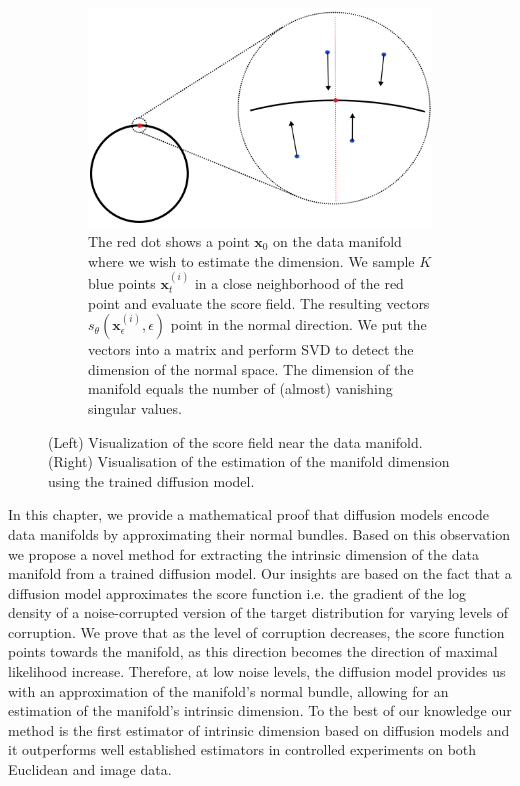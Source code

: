 \begin{figure}[h]
\begin{subfigure}[t]{0.45\linewidth}
        \includegraphics[width=\linewidth]{Outline/figures/id-diff/drawing.png}
        \caption{The red dot shows a point $\textbf{x}_0$ on the data manifold where we wish to estimate the dimension. We sample $K$ blue points $\textbf{x}_t^{(i)}$ in a close neighborhood of the red point and evaluate the score field. The resulting vectors $s_\theta(\textbf{x}_\epsilon^{(i)}, \epsilon)$ point in the normal direction. We put the vectors into a matrix and perform SVD to detect the dimension of the normal space. The dimension of the manifold equals the number of (almost) vanishing singular values.}
        \label{fig:zoom}
    \end{subfigure}
    \caption{(Left) Visualization of the score field near the data manifold. (Right) Visualisation of the estimation of the manifold dimension using the trained diffusion model.}
    \label{fig:score_estimation}
\end{figure}



In this chapter, we provide a mathematical proof
that diffusion models encode data manifolds by
approximating their normal bundles. Based on
this observation we propose a novel method for
extracting the intrinsic dimension of the data manifold from a trained diffusion model. Our insights
are based on the fact that a diffusion model approximates the score function i.e. the gradient
of the log density of a noise-corrupted version of
the target distribution for varying levels of corruption. We prove that as the level of corruption
decreases, the score function points towards the
manifold, as this direction becomes the direction
of maximal likelihood increase. Therefore, at
low noise levels, the diffusion model provides us
with an approximation of the manifold’s normal
bundle, allowing for an estimation of the manifold’s intrinsic dimension. To the best of our
knowledge our method is the first estimator of
intrinsic dimension based on diffusion models
and it outperforms well established estimators in
controlled experiments on both Euclidean and
image data.

